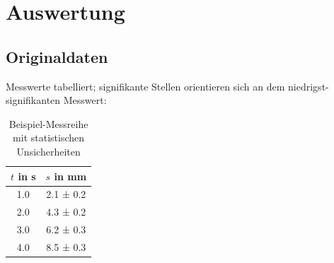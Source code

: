 
\section{Auswertung}
\label{cap:Auswertung}

\subsection{Originaldaten}
\label{cap:Originaldaten}
Messwerte tabelliert; signifikante Stellen orientieren sich an dem niedrigst-signifikanten Messwert:
\begin{table}[H]
    \centering
    \caption{Beispiel-Messreihe mit statistischen Unsicherheiten}
    \begin{tabular}{c|c}
        \label{tab:Messreihe}
        $t$ in s & $s$ in mm \\
        \hline
        1.0 & 2.1 ± 0.2 \\
        2.0 & 4.3 ± 0.2 \\
        3.0 & 6.2 ± 0.3 \\
        4.0 & 8.5 ± 0.3 \\
    \end{tabular}
\end{table}

